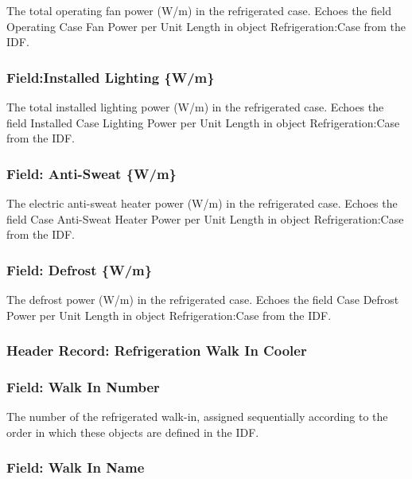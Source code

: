 The total operating fan power (W/m) in the refrigerated case. Echoes the field Operating Case Fan Power per Unit Length in object Refrigeration:Case from the IDF.

\subsubsection{Field:Installed Lighting \{W/m\}}\label{fieldinstalled-lighting-wm}

The total installed lighting power (W/m) in the refrigerated case. Echoes the field Installed Case Lighting Power per Unit Length in object Refrigeration:Case from the IDF.

\subsubsection{Field: Anti-Sweat \{W/m\}}\label{field-anti-sweat-wm}

The electric anti-sweat heater power (W/m) in the refrigerated case. Echoes the field Case Anti-Sweat Heater Power per Unit Length in object Refrigeration:Case from the IDF.

\subsubsection{Field: Defrost \{W/m\}}\label{field-defrost-wm}

The defrost power (W/m) in the refrigerated case. Echoes the field Case Defrost Power per Unit Length in object Refrigeration:Case from the IDF.

\subsubsection{Header Record: Refrigeration Walk In Cooler}\label{header-record-refrigeration-walk-in-cooler}

\subsubsection{Field: Walk In Number}\label{field-walk-in-number}

The number of the refrigerated walk-in, assigned sequentially according to the order in which these objects are defined in the IDF.

\subsubsection{Field: Walk In Name}\label{field-walk-in-name}

